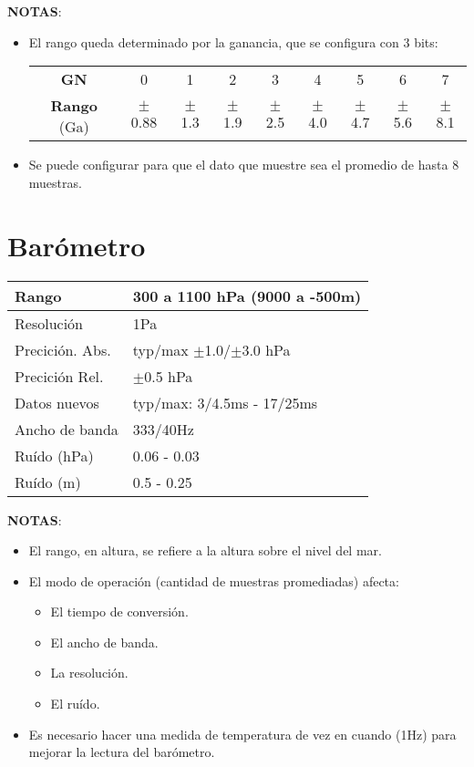 \documentclass[spanish,12pt,a4paper,titlepage]{report}
\begin{document}
\textbf{NOTAS}:
\begin{itemize}
\item El rango queda determinado por la ganancia, que se configura con 3 bits:
\begin{table}[H]
\begin{center}
\begin{tabular}{|c|c|c|c|c|c|c|c|c|}
\hline
\textbf{GN} & 0 & 1 & 2 & 3 & 4 & 5 & 6 & 7 \\
\textbf{Rango} (Ga)& $\pm$0.88 & $\pm$1.3 & $\pm$1.9 & $\pm$2.5 & $\pm$4.0 & $\pm$4.7 & $\pm$5.6 & $\pm$8.1 \\
\hline
\end{tabular}
\label{tab:magn-gain}
\end{center}
\end{table}
\item Se puede configurar para que el dato que muestre sea el promedio de hasta 8 muestras.
\end{itemize}

\section{Barómetro}
\label{sec:barometro}

\begin{table}[H]
\begin{center}
\begin{tabular}{|p{3cm}|p{6.5cm}|}
\hline
Rango & 300 a 1100 hPa (9000 a -500m)\\
\hline
Resolución &  1Pa\\
\hline
Precición. Abs. & typ/max $\pm$1.0/$\pm$3.0 hPa \\
\hline
Precición Rel. & $\pm$0.5 hPa \\
\hline
Datos nuevos &  typ/max: 3/4.5ms - 17/25ms\\
\hline
Ancho de banda &  333/40Hz\\
\hline
Ruído (hPa) &  0.06 - 0.03\\
\hline
Ruído (m) & 0.5 - 0.25 \\
\hline
\end{tabular}
\label{tab:barometro}
\end{center}
\end{table}

\textbf{NOTAS}:
\begin{itemize}
\item El rango, en altura, se refiere a la altura sobre el nivel del mar.
\item El modo de operación (cantidad de muestras promediadas) afecta:
  \begin{itemize}
  \item El tiempo de conversión.
  \item El ancho de banda.
  \item La resolución.
  \item El ruído.
  \end{itemize}
\item Es necesario hacer una medida de temperatura de vez en cuando (1Hz) para mejorar la lectura del barómetro.
\end{itemize}
\end{document}
